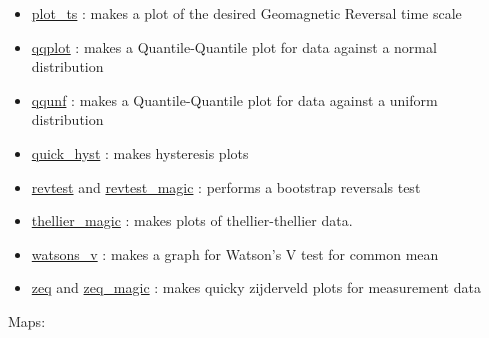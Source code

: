 \documentclass[11pt]{book}
\begin{document}
{{\begin{itemize}
\item \href{https://pmagpy.github.io/PmagPy_plots_analysis.html#plot_ts}{plot\_ts} : makes a plot of the desired Geomagnetic Reversal time scale
\item \href{https://pmagpy.github.io/PmagPy_plots_analysis.html#qqplot}{qqplot} : makes a Quantile-Quantile plot for data against a normal distribution
\item \href{https://pmagpy.github.io/PmagPy_plots_analysis.html#qqunf}{qqunf} : makes a Quantile-Quantile plot for data against a uniform distribution
\item \href{https://pmagpy.github.io/PmagPy_plots_analysis.html#quick_hyst}{quick\_hyst} : makes hysteresis plots
\item \href{https://pmagpy.github.io/PmagPy_plots_analysis.html#revtest}{revtest} and \href {https://pmagpy.github.io/PmagPy_plots_analysis.html#revtest_magic}{revtest\_magic} : performs a bootstrap reversals test
\item \href{https://pmagpy.github.io/PmagPy_plots_analysis.html#thellier_magic}{thellier\_magic} : makes plots of thellier-thellier data.
\item \href{https://pmagpy.github.io/PmagPy_plots_analysis.html#watsons_v}{watsons\_v} : makes a graph for Watson's V test for common mean
\item \href{https://pmagpy.github.io/PmagPy_plots_analysis.html#zeq}{zeq} and \href{https://pmagpy.github.io/PmagPy_plots_analysis.html#zeq_magic}{zeq\_magic} : makes quicky zijderveld plots for measurement data

\end{itemize}

Maps:

\begin{itemize}



\end{itemize}}}
\end{document}

